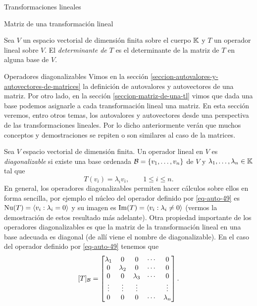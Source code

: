 \begin{chapter}{Transformaciones lineales}
\begin{section}{Matriz de una transformaci\'on lineal}
        \begin{definicion} 
                Sea $V$ un espacio vectorial de dimensión finita sobre el cuerpo $\mathbb K$ y $T$ un operador lineal sobre $V$. El \textit{determinante de $T$} es el determinante de la matriz de $T$ en alguna base de $V$.  
        \end{definicion}
        \end{section}    
    
        \begin{section}{Operadores diagonalizables}\label{seccion-autovalores-y-autovectores-de-una-tl}
        Vimos en la sección  \ref{seccion-autovalores-y-autovectores-de-matrices} la definición de autovalores y autovectores de una matriz. Por otro lado,  en la sección \ref{seccion-matriz-de-una-tl} vimos que dada una base podemos asignarle a cada transformación lineal una matriz. En  esta sección veremos,  entro otros temas,  los autovalores y autovectores desde una perspectiva de las transformaciones lineales. Por lo dicho anteriormente  verán que muchos conceptos y demostraciones se repiten o son similares al caso de la matrices. 
        
        Sea $V$ espacio vectorial de dimensión finita. Un operador lineal en $V$ es \textit{diagonalizable}  si existe una base ordenada $\mathcal{B}= \{v_1,\ldots,v_n\}$ de $V$ y $\lambda_1,\ldots,\lambda_n \in \mathbb K$ tal que 
        \begin{equation}\label{eq-auto-49}
            T(v_i) = \lambda_i v_i,\qquad 1\le i \le n. 
        \end{equation}
        En  general, los operadores diagonalizables permiten hacer cálculos sobre ellos en forma sencilla, por ejemplo el núcleo del  operador definido por \eqref{eq-auto-49} es $\operatorname{Nu}(T)=\langle v_i: \lambda_i =0 \rangle$ y  su imagen es $\operatorname{Im}(T)=\langle v_i: \lambda_i \not=0 \rangle$ (vermos la demostración de estos resultado más adelante). 
        Otra propiedad importante de los operadores diagonalizables es que la matriz de la transformación lineal en una base adecuada es diagonal (de allí viene el nombre de diagonalizable). En  el caso del  operador definido por \eqref{eq-auto-49} tenemos que
        $$
        [T]_{\mathcal{B}} = 
        \begin{bmatrix}
        \lambda_1&0&0&\cdots&0 \\
        0&\lambda_2&0&\cdots&0\\
        0&0&\lambda_3&\cdots&0\\
        \vdots&\vdots&\vdots&&\vdots\\
        0&0&0&\cdots&\lambda_n
        \end{bmatrix}.
        $$
        

\end{section}
\end{chapter}
